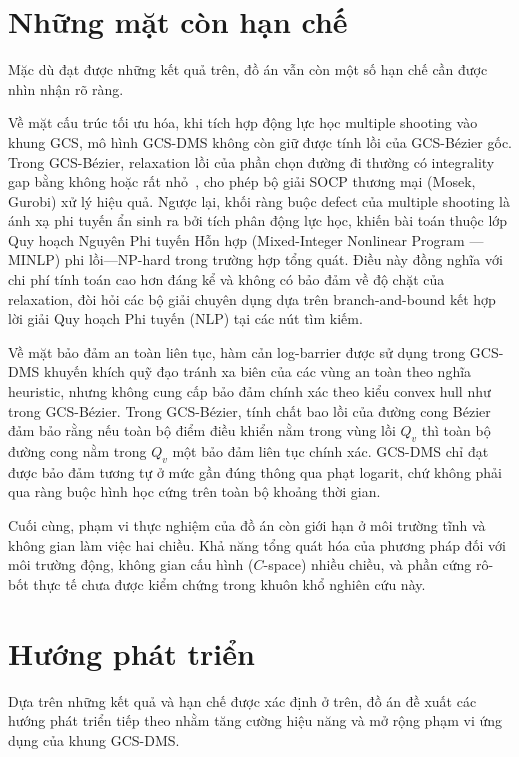 \section{Những mặt còn hạn chế}
\label{sec:conclusion_limitations}

Mặc dù đạt được những kết quả trên, đồ án vẫn còn một số hạn chế cần được nhìn
nhận rõ ràng.

Về mặt cấu trúc tối ưu hóa, khi tích hợp động lực học multiple shooting vào
khung GCS, mô hình GCS-DMS không còn giữ được tính lồi của GCS-Bézier gốc.
Trong GCS-Bézier, relaxation lồi của phần chọn đường đi thường có integrality
gap bằng không hoặc rất nhỏ~\cite{MarcucciEtAl2023GCS}, cho phép bộ giải SOCP
thương mại (Mosek, Gurobi) xử lý hiệu quả. Ngược lại, khối ràng buộc defect của
multiple shooting là ánh xạ phi tuyến ẩn sinh ra bởi tích phân động lực học,
khiến bài toán thuộc lớp Quy hoạch Nguyên Phi tuyến Hỗn hợp (Mixed-Integer
Nonlinear Program --- MINLP) phi lồi---NP-hard trong trường hợp tổng quát. Điều
này đồng nghĩa với chi phí tính toán cao hơn đáng kể và không có bảo đảm về độ
chặt của relaxation, đòi hỏi các bộ giải chuyên dụng dựa trên branch-and-bound
kết hợp lời giải Quy hoạch Phi tuyến (NLP) tại các nút tìm kiếm.

Về mặt bảo đảm an toàn liên tục, hàm cản log-barrier được sử dụng trong GCS-DMS
khuyến khích quỹ đạo tránh xa biên của các vùng an toàn theo nghĩa heuristic,
nhưng không cung cấp bảo đảm chính xác theo kiểu convex hull như trong
GCS-Bézier. Trong GCS-Bézier, tính chất bao lồi của đường cong Bézier đảm bảo
rằng nếu toàn bộ điểm điều khiển nằm trong vùng lồi $Q_v$ thì toàn bộ đường
cong nằm trong $Q_v$ một bảo đảm liên tục chính xác. GCS-DMS chỉ đạt được bảo
đảm tương tự ở mức gần đúng thông qua phạt logarit, chứ không phải qua ràng
buộc hình học cứng trên toàn bộ khoảng thời gian.

Cuối cùng, phạm vi thực nghiệm của đồ án còn giới hạn ở môi trường tĩnh và
không gian làm việc hai chiều. Khả năng tổng quát hóa của phương pháp đối với
môi trường động, không gian cấu hình ($C$-space) nhiều chiều, và phần cứng
rô-bốt thực tế chưa được kiểm chứng trong khuôn khổ nghiên cứu này.

\section{Hướng phát triển}
\label{sec:conclusion_future}

Dựa trên những kết quả và hạn chế được xác định ở trên, đồ án đề xuất các hướng
phát triển tiếp theo nhằm tăng cường hiệu năng và mở rộng phạm vi ứng dụng của
khung GCS-DMS.

